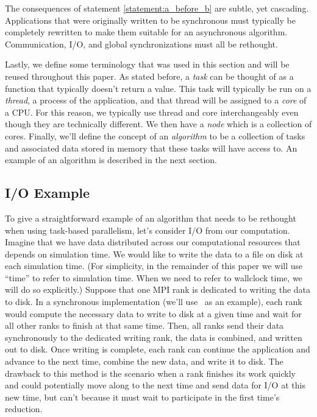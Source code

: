 \begin{bibunit}[unsrtnat]
The consequences of statement \ref{statement:a_before_b} are subtle, yet
cascading. Applications that were originally written to be synchronous must
typically be completely rewritten to make them suitable for an asynchronous
algorithm. Communication, I/O, and global synchronizations must all be
rethought.

Lastly, we define some terminology that was used in this section and will be
reused throughout this paper. As stated before, a \textit{task} can be thought
of as a function that typically doesn't return a value. This task will typically
be run on a \textit{thread}, a process of the application, and that thread will
be assigned to a \textit{core} of a CPU. For this reason, we typically use
thread and core interchangeably even though they are technically different. We
then have a \textit{node} which is a collection of cores. Finally, we'll define
the concept of an \textit{algorithm} to be a collection of tasks and associated
data stored in memory that these tasks will have access to. An example of an
algorithm is described in the next section.

\subsection{I/O Example\label{sec:io}}

To give a straightforward example of an algorithm that needs to be rethought
when using task-based parallelism, let's consider I/O from our computation.
Imagine that we have data distributed across our computational resources that
depends on simulation time. We would like to write the data to a file on disk at
each simulation time. (For simplicity, in the remainder of this paper we will
use ``time'' to refer to simulation time. When we need to refer to wallclock
time, we will do so explicitly.) Suppose that one MPI rank is dedicated to
writing the data to disk. In a synchronous implementation (we'll use \spec~as an
example), each rank would compute the necessary data to write to disk at a given
time and wait for all other ranks to finish at that same time. Then, all ranks
send their data synchronously to the dedicated writing rank, the data is
combined, and written out to disk. Once writing is complete, each rank can
continue the application and advance to the next time, combine the new data, and
write it to disk. The drawback to this method is the scenario when a rank
finishes its work quickly and could potentially move along to the next time and
send data for I/O at this new time, but can't because it must wait to
participate in the first time's reduction.


\end{bibunit}
